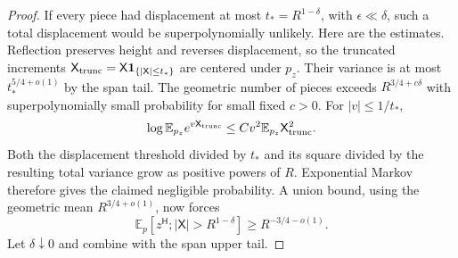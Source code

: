 \begin{proof}
If every piece had displacement at most $t_*=R^{1-\delta}$, with
$\epsilon\ll\delta$, such a total displacement would be superpolynomially
unlikely. Here are the estimates. Reflection preserves height and
reverses displacement, so the truncated increments
$\mathsf X_{\rm trunc}=\mathsf X\mathbf1_{\{|\mathsf X|\le t_*\}}$
are centered under $p_z$. Their variance is at most $t_*^{5/4+o(1)}$ by the
span tail. The geometric number of pieces exceeds
$R^{3/4+c\delta}$ with superpolynomially small probability for small fixed
$c>0$. For $|v|\le1/t_*$,
\[
 \log\mathbb E_{p_z}e^{v\mathsf X_{\rm trunc}}
   \le C v^2\mathbb E_{p_z}\mathsf X_{\rm trunc}^2.
\]
Both the displacement threshold divided by $t_*$ and its square divided
by the resulting total variance grow as positive powers of $R$.
Exponential Markov therefore gives the claimed negligible probability.
A union bound, using the geometric mean $R^{3/4+o(1)}$, now forces
\[
 \mathbb E_p[z^{\mathsf H};|\mathsf X|>R^{1-\delta}]
       \ge R^{-3/4-o(1)}.
\]
Let $\delta\downarrow0$ and combine with the span upper tail.
\end{proof}

